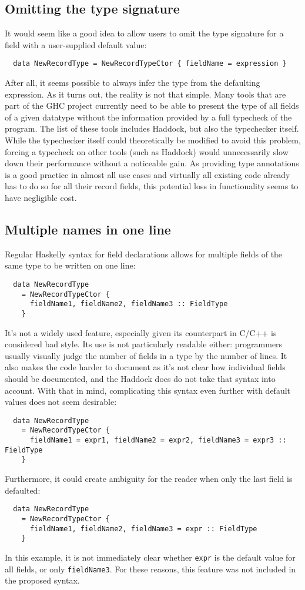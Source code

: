 \documentclass[en]{pracamgr}
\newcommand{\code}[1]{\lstinline[breaklines=true]{#1}}
\begin{document}
\subsection{Omitting the type signature}
It would seem like a good idea to allow users to omit the type signature for a field with a user-supplied default value:
\begin{lstlisting}
  data NewRecordType = NewRecordTypeCtor { fieldName = expression }
\end{lstlisting}
After all, it seems possible to always infer the type from the defaulting expression.
As it turns out, the reality is not that simple.
Many tools that are part of the GHC project currently need to be able to present the type of all fields of a given datatype without the information provided by a full typecheck of the program.
The list of these tools includes Haddock, but also the typechecker itself.
While the typechecker itself could theoretically be modified to avoid this problem, 
forcing a typecheck on other tools (such as Haddock) would unnecessarily slow down their performance without a noticeable gain.
As providing type annotations is a good practice in almost all use cases and virtually all existing code already has to do so 
for all their record fields, this potential loss in functionality seems to have negligible cost.

\subsection{Multiple names in one line}
Regular Haskelly syntax for field declarations allows for multiple fields of the same type to be written on one line:
\begin{lstlisting}
  data NewRecordType 
    = NewRecordTypeCtor { 
      fieldName1, fieldName2, fieldName3 :: FieldType 
    }
\end{lstlisting}
It's not a widely used feature, especially given its counterpart in C/C++ is considered bad style.
Its use is not particularly readable either: programmers usually visually judge the number of fields in a type by the number of lines.
It also makes the code harder to document as it's not clear how individual fields should be documented, and the Haddock docs \cite{HaddockRecordFields}
do not take that syntax into account.
With that in mind, complicating this syntax even further with default values does not seem desirable:
\begin{lstlisting}
  data NewRecordType 
    = NewRecordTypeCtor { 
      fieldName1 = expr1, fieldName2 = expr2, fieldName3 = expr3 :: FieldType 
    }
\end{lstlisting}
Furthermore, it could create ambiguity for the reader when only the last field is defaulted:
\begin{lstlisting}
  data NewRecordType 
    = NewRecordTypeCtor { 
      fieldName1, fieldName2, fieldName3 = expr :: FieldType 
    }
\end{lstlisting}
In this example, it is not immediately clear whether \code{expr} is the default value for all fields, or only \code{fieldName3}.
For these reasons, this feature was not included in the proposed syntax.
\end{document}
